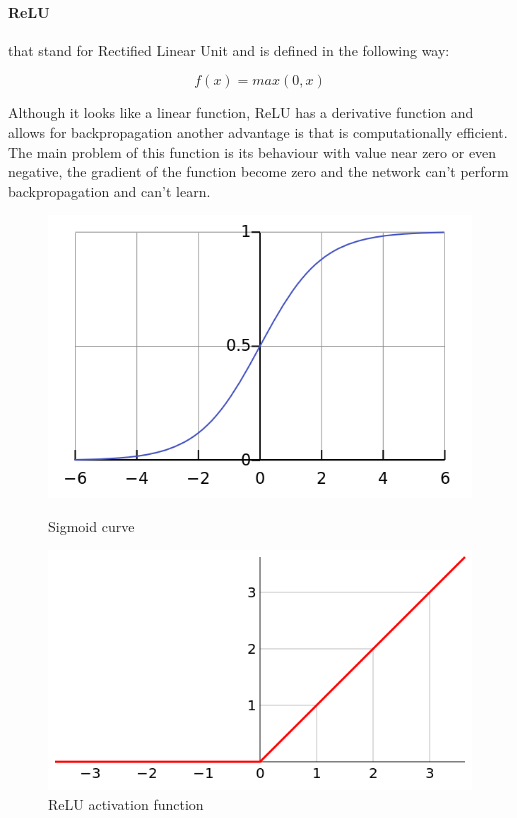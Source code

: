 \documentclass[%
    corpo=12pt,
    twoside,
    oldstyle,
    autoretitolo,
    greek,
    evenboxes,
]{toptesi}
\begin{document}
\paragraph{ReLU} that stand for Rectified Linear Unit and is defined in the following way:
\begin{center}
  \begin{equation}
    f(x)= max(0, x)
  \end{equation}
\end{center}

Although it looks like a linear function, ReLU has a derivative function and allows for backpropagation another advantage is that is computationally efficient. The main problem of this function is its behaviour with value near zero or even negative, the gradient of the function become zero and the network can't perform backpropagation and can't learn.

\begin{figure}
  \centering
  \begin{minipage}{.5\textwidth}
    \centering
    \includegraphics[width=0.8\linewidth]{figure/sigmoid.png}
    \caption{Sigmoid curve}
    \label{fig:sigmoid}
  \end{minipage}%
  \begin{minipage}{.5\textwidth}
    \centering
    \includegraphics[width=0.8\linewidth]{figure/relu.png}
    \caption{ReLU activation function}
    \label{fig:relu}
  \end{minipage}
\end{figure}
\end{document}
